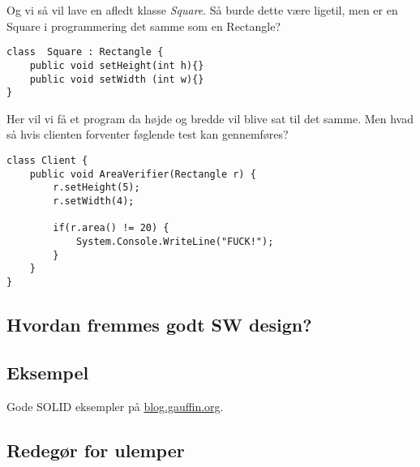 Og vi så vil lave en afledt klasse \textit{Square}. Så burde dette være ligetil, men er en Square i programmering det samme som en Rectangle?

\begin{lstlisting}
class  Square : Rectangle {
	public void setHeight(int h){}
	public void setWidth (int w){}
}
\end{lstlisting}

Her vil vi få et program da højde og bredde vil blive sat til det samme. Men hvad så hvis clienten forventer føglende test kan gennemføres?

\begin{lstlisting}
class Client {
	public void AreaVerifier(Rectangle r) {
		r.setHeight(5);
		r.setWidth(4);
		
		if(r.area() != 20) {
			System.Console.WriteLine("FUCK!");
		}
	}
}
\end{lstlisting}



\subsection{Hvordan fremmes godt SW design?}

\subsection{Eksempel}
Gode SOLID eksempler på \href{http://blog.gauffin.org/2012/05/11/solid-principles-with-real-world-examples/}{blog.gauffin.org}.

\subsection{Redegør for ulemper}